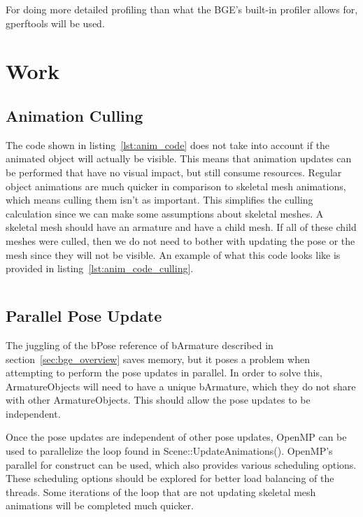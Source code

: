 \documentclass[]{article}
\newcommand{\includecode}[3] {
\begin{center}
 \inputminted[tabsize=4,
              bgcolor=codebg
 ]{#1}{code/#2.#1}
 \captionof{listing}{#3}
 \label{lst:#2}
\end{center}
}
\newcommand{\includecpp}[2] {\includecode{cpp}{#1}{#2}}
\begin{document}
For doing more detailed profiling than what the BGE's built-in profiler allows for, gperftools\cite{gperftools} will be used.

\section{Work}

\subsection{Animation Culling}

The code shown in listing~\ref{lst:anim_code} does not take into account if the animated object will actually be visible. This means that animation updates can be performed that have no visual impact, but still consume resources. Regular object animations are much quicker in comparison to skeletal mesh animations, which means culling them isn't as important. This simplifies the culling calculation since we can make some assumptions about skeletal meshes. A skeletal mesh should have an armature and have a child mesh. If all of these child meshes were culled, then we do not need to bother with updating the pose or the mesh since they will not be visible. An example of what this code looks like is provided in listing~\ref{lst:anim_code_culling}.

\includecpp{anim_code_culling}{BGE animation code with culling}

\subsection{Parallel Pose Update}

The juggling of the bPose reference of bArmature described in section~\ref{sec:bge_overview} saves memory, but it poses a problem when attempting to perform the pose updates in parallel. In order to solve this, ArmatureObjects will need to have a unique bArmature, which they do not share with other ArmatureObjects. This should allow the pose updates to be independent.

Once the pose updates are independent of other pose updates, OpenMP\cite{openmp} can be used to parallelize the loop found in Scene::UpdateAnimations(). OpenMP's parallel for construct can be used, which also provides various scheduling options. These scheduling options should be explored for better load balancing of the threads. Some iterations of the loop that are not updating skeletal mesh animations will be completed much quicker.
\end{document}
